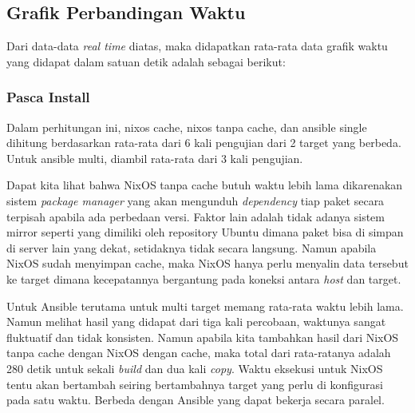 \documentclass[10pt,]{report}
\begin{document}
\begin{adjustwidth}{20pt}{}
	\subsection{Grafik Perbandingan Waktu}
	\begin{adjustwidth}{20pt}{}
		Dari data-data \textit{real time} diatas, maka didapatkan
		rata-rata data grafik waktu yang didapat dalam satuan
		detik adalah sebagai berikut:
	\end{adjustwidth}
	\subsubsection{Pasca Install}
	\begin{adjustwidth}{20pt}{}
		Dalam perhitungan ini, nixos cache, nixos tanpa cache, dan ansible single
		dihitung berdasarkan rata-rata dari 6 kali pengujian dari 2 target yang berbeda.
		Untuk ansible multi, diambil rata-rata dari 3 kali pengujian.
	\end{adjustwidth}
	\begin{adjustwidth}{20pt}{}
		Dapat kita lihat bahwa NixOS tanpa cache butuh waktu lebih lama dikarenakan
		sistem \textit{package manager} yang akan mengunduh \textit{dependency} tiap
		paket secara terpisah apabila ada perbedaan versi. Faktor lain adalah
		tidak adanya sistem mirror seperti yang dimiliki oleh
		repository Ubuntu dimana paket bisa di simpan di server lain yang dekat, setidaknya
		tidak secara langsung.
		Namun apabila NixOS sudah menyimpan cache, maka NixOS hanya perlu menyalin
		data tersebut ke target dimana kecepatannya bergantung pada koneksi antara
		\textit{host} dan target.

		Untuk Ansible terutama untuk multi target memang rata-rata waktu lebih lama.
		Namun melihat hasil yang didapat dari tiga kali percobaan, waktunya sangat
		fluktuatif dan tidak konsisten.
		Namun apabila kita tambahkan hasil dari NixOS tanpa cache dengan NixOS
		dengan cache, maka total dari rata-ratanya adalah 280 detik untuk
		sekali \textit{build} dan dua kali \textit{copy}.
		Waktu eksekusi untuk NixOS tentu akan bertambah seiring bertambahnya
		target yang perlu di konfigurasi pada satu waktu. Berbeda dengan Ansible yang
		dapat bekerja secara paralel.


\end{adjustwidth}
\end{adjustwidth}
\end{document}
